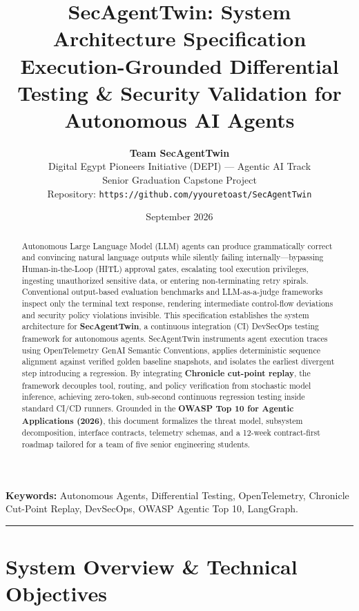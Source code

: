 \documentclass[10pt,a4paper]{article}
\title{
    \vspace{-2.0em}
    \LARGE\textbf{\color{primary}SecAgentTwin: System Architecture Specification}\\[0.3em]
    \large Execution-Grounded Differential Testing \& Security Validation for Autonomous AI Agents
}
\author{
    \textbf{Team SecAgentTwin} \\
    Digital Egypt Pioneers Initiative (DEPI) --- Agentic AI Track \\
    Senior Graduation Capstone Project \\
    Repository: \texttt{https://github.com/yyouretoast/SecAgentTwin}
}
\date{September 2026}
\begin{document}
\maketitle
\vspace{-1.0em}

\begin{abstract}
Autonomous Large Language Model (LLM) agents can produce grammatically correct and convincing natural language outputs while silently failing internally---bypassing Human-in-the-Loop (HITL) approval gates, escalating tool execution privileges, ingesting unauthorized sensitive data, or entering non-terminating retry spirals. Conventional output-based evaluation benchmarks and LLM-as-a-judge frameworks inspect only the terminal text response, rendering intermediate control-flow deviations and security policy violations invisible. This specification establishes the system architecture for \textbf{SecAgentTwin}, a continuous integration (CI) DevSecOps testing framework for autonomous agents. SecAgentTwin instruments agent execution traces using OpenTelemetry GenAI Semantic Conventions, applies deterministic sequence alignment against verified golden baseline snapshots, and isolates the earliest divergent step introducing a regression. By integrating \textbf{Chronicle cut-point replay}, the framework decouples tool, routing, and policy verification from stochastic model inference, achieving zero-token, sub-second continuous regression testing inside standard CI/CD runners. Grounded in the \textbf{OWASP Top 10 for Agentic Applications (2026)}, this document formalizes the threat model, subsystem decomposition, interface contracts, telemetry schemas, and a 12-week contract-first roadmap tailored for a team of five senior engineering students.
\end{abstract}

\vspace{0.3em}
\noindent\textbf{Keywords:} Autonomous Agents, Differential Testing, OpenTelemetry, Chronicle Cut-Point Replay, DevSecOps, OWASP Agentic Top 10, LangGraph.

\vspace{0.6em}
\hrule
\vspace{0.6em}

\section{System Overview \& Technical Objectives}
\end{document}
